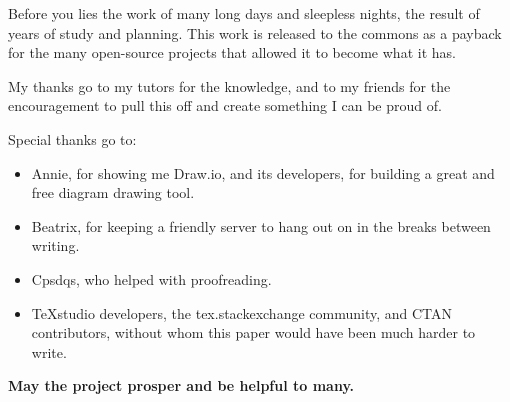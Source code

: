\begin{thanks}

Before you lies the work of many long days and sleepless nights, the result of years of study and planning. This work is released to the commons as a payback for the many open-source projects that allowed it to become what it has.

My thanks go to my tutors for the knowledge, and to my friends for the encouragement to pull this off and create something I can be proud of. 

\noindent
Special thanks go to:

\begin{itemize}
\item Annie, for showing me Draw.io, and its developers, for building a great and free diagram drawing tool.
\item Beatrix, for keeping a friendly server to hang out on in the breaks between writing.
\item Cpsdqs, who helped with proofreading.
\item TeXstudio developers, the tex.stackexchange community, and CTAN contributors, without whom this paper would have been much harder to write.
\end{itemize}

\noindent
\textbf{May the project prosper and be helpful to many.}

\end{thanks}
